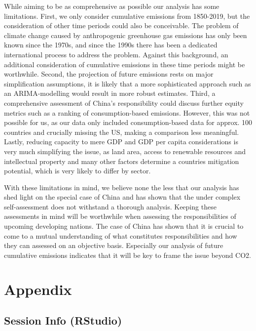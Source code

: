 \documentclass[
  12pt,
]{article}
\numberwithin{equation}{section}
\numberwithin{table}{section}
\numberwithin{figure}{section}
\begin{document}
While aiming to be as comprehensive as possible our analysis has some
limitations. First, we only consider cumulative emissions from
1850-2019, but the consideration of other time periods could also be
conceivable. The problem of climate change caused by anthropogenic
greenhouse gas emissions has only been known since the 1970s, and since
the 1990s there has been a dedicated international process to address
the problem. Against this background, an additional consideration of
cumulative emissions in these time periods might be worthwhile. Second,
the projection of future emissions rests on major simplification
assumptions, it is likely that a more sophisticated approach such as an
ARIMA-modelling would result in more robust estimates. Third, a
comprehensive assessment of China's responsibility could discuss further
equity metrics such as a ranking of consumption-based emissions.
However, this was not possible for us, as our data only included
consumption-based data for approx. 100 countries and crucially missing
the US, making a comparison less meaningful. Lastly, reducing capacity
to mere GDP and GDP per capita considerations is very much simplifying
the issue, as land area, access to renewable resources and intellectual
property and many other factors determine a countries mitigation
potential, which is very likely to differ by sector.

With these limitations in mind, we believe none the less that our
analysis has shed light on the special case of China and has shown that
the under complex self-assessment does not withstand a thorough
analysis. Keeping these assessments in mind will be worthwhile when
assessing the responsibilities of upcoming developing nations. The case
of China has shown that it is crucial to come to a mutual understanding
of what constitutes responsibilities and how they can assessed on an
objective basis. Especially our analysis of future cumulative emissions
indicates that it will be key to frame the issue beyond CO2.

\appendix
\section*{Appendix}
\renewcommand{\thesubsection}{\Alph{subsection}}
\newcommand{\subsectionbreak}{\clearpage\phantomsection}

\normalsize

\hypertarget{session-info-rstudio}{%
\subsection{Session Info (RStudio)}\label{session-info-rstudio}}
\end{document}
